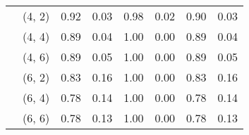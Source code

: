\begin{tabular}{llrrrrrr}
    & (4, 2) &     0.92 & 0.03 &     0.98 & 0.02 &  0.90 & 0.03 \\
    & (4, 4) &     0.89 & 0.04 &     1.00 & 0.00 &  0.89 & 0.04 \\
    & (4, 6) &     0.89 & 0.05 &     1.00 & 0.00 &  0.89 & 0.05 \\
    & (6, 2) &     0.83 & 0.16 &     1.00 & 0.00 &  0.83 & 0.16 \\
    & (6, 4) &     0.78 & 0.14 &     1.00 & 0.00 &  0.78 & 0.14 \\
    & (6, 6) &     0.78 & 0.13 &     1.00 & 0.00 &  0.78 & 0.13 \\
\bottomrule
\end{tabular}
